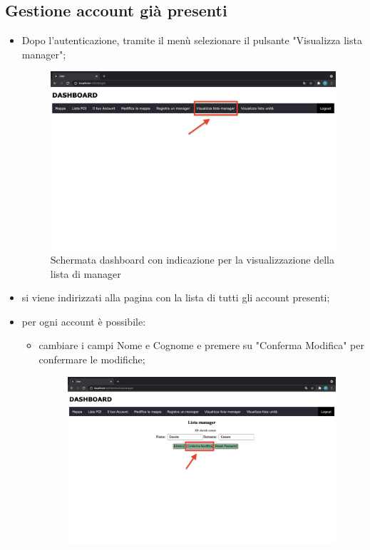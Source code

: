 \subsection{Gestione account già presenti}
\begin{itemize}
    \item Dopo l'autenticazione, tramite il menù selezionare il pulsante "Visualizza lista manager";
    \begin{figure}[H]
        \centering
        \includegraphics[scale=0.12]{res/images/dashboard5.png}
        \caption{Schermata dashboard con indicazione per la visualizzazione della lista di manager}
    \end{figure}
    \item si viene indirizzati alla pagina con la lista di tutti gli account presenti;
    \item per ogni account è possibile:
        \begin{itemize}
            \item cambiare i campi Nome e Cognome e premere su "Conferma Modifica" per confermare le modifiche;
            \begin{figure}[H]
                \centering
                \includegraphics[scale=0.12]{res/images/modificamanager.png}

\end{figure}
\end{itemize}
\end{itemize}
